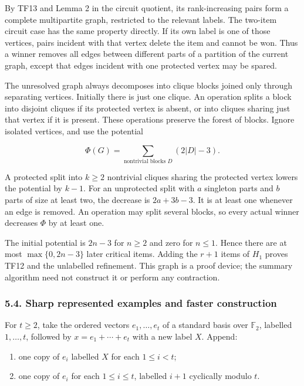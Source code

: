 By TF13 and Lemma 2 in the circuit quotient, its rank-increasing pairs form a complete multipartite graph, restricted to the relevant labels. The two-item circuit case has the same property directly. If its own label is one of those vertices, pairs incident with that vertex delete the item and cannot be won. Thus a winner removes all edges between different parts of a partition of the current graph, except that edges incident with one protected vertex may be spared.

The unresolved graph always decomposes into clique blocks joined only through separating vertices. Initially there is just one clique. An operation splits a block into disjoint cliques if its protected vertex is absent, or into cliques sharing just that vertex if it is present. These operations preserve the forest of blocks. Ignore isolated vertices, and use the potential

\[
\Phi(G)=\sum_{\text{nontrivial blocks }D}(2|D|-3).
\]

A protected split into \(k\ge2\) nontrivial cliques sharing the protected vertex lowers the potential by \(k-1\). For an unprotected split with \(a\) singleton parts and \(b\) parts of size at least two, the decrease is \(2a+3b-3\). It is at least one whenever an edge is removed. An operation may split several blocks, so every actual winner decreases \(\Phi\) by at least one.

The initial potential is \(2n-3\) for \(n\ge2\) and zero for \(n\le1\). Hence there are at most \(\max\{0,2n-3\}\) later critical items. Adding the \(r+1\) items of \(H_1\) proves TF12 and the unlabelled refinement. This graph is a proof device; the summary algorithm need not construct it or perform any contraction.

\hypertarget{af-0a3ce40617-sharp-represented-examples-and-faster-construction}{%
\subsubsection{5.4. Sharp represented examples and faster construction}\label{af-0a3ce40617-sharp-represented-examples-and-faster-construction}}

For \(t\ge2\), take the ordered vectors \(e_1,\ldots,e_t\) of a standard basis over \(\mathbb F_2\), labelled \(1,\ldots,t\), followed by \(x=e_1+\cdots+e_t\) with a new label \(X\). Append:

\begin{enumerate}
\def\labelenumi{\arabic{enumi}.}
\tightlist
\item
  one copy of \(e_i\) labelled \(X\) for each \(1\le i<t\);
\item
  one copy of \(e_i\) for each \(1\le i\le t\), labelled \(i+1\) cyclically modulo \(t\).
\end{enumerate}

